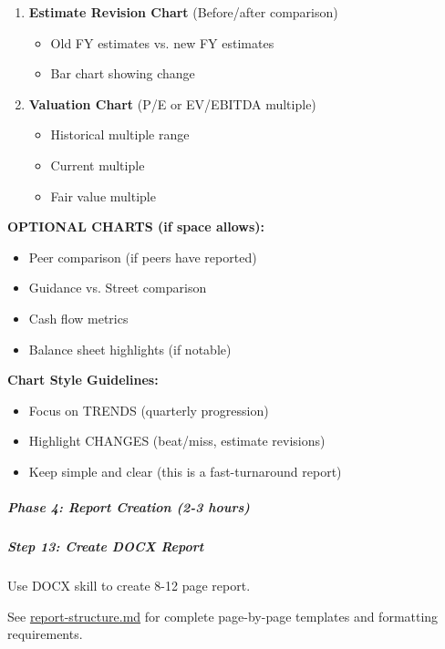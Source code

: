 \documentclass[11pt]{article}
\begin{document}
\begin{enumerate}[leftmargin=*,itemsep=2pt,topsep=2pt]
\begin{itemize}[leftmargin=*,itemsep=2pt,topsep=2pt]
\end{itemize}
\item {} \textbf{Estimate Revision Chart} (Before/after comparison)
\begin{itemize}[leftmargin=*,itemsep=2pt,topsep=2pt]
\item {} Old FY estimates vs. new FY estimates
\item {} Bar chart showing change
\end{itemize}
\item {} \textbf{Valuation Chart} (P/E or EV/EBITDA multiple)
\begin{itemize}[leftmargin=*,itemsep=2pt,topsep=2pt]
\item {} Historical multiple range
\item {} Current multiple
\item {} Fair value multiple
\end{itemize}
\end{enumerate}

\textbf{OPTIONAL CHARTS (if space allows):}

\begin{itemize}[leftmargin=*,itemsep=2pt,topsep=2pt]
\item {} Peer comparison (if peers have reported)
\item {} Guidance vs. Street comparison
\item {} Cash flow metrics
\item {} Balance sheet highlights (if notable)
\end{itemize}

\textbf{Chart Style Guidelines:}

\begin{itemize}[leftmargin=*,itemsep=2pt,topsep=2pt]
\item {} Focus on TRENDS (quarterly progression)
\item {} Highlight CHANGES (beat/miss, estimate revisions)
\item {} Keep simple and clear (this is a fast-turnaround report)
\end{itemize}

\subparagraph{Phase 4: Report Creation (2-3 hours)}\mbox{}\par

\subparagraph{Step 13: Create DOCX Report}\mbox{}\par

Use DOCX skill to create 8-12 page report.


See \href{report-structure.md}{report-structure.md} for complete page-by-page templates and formatting requirements.
\end{document}

